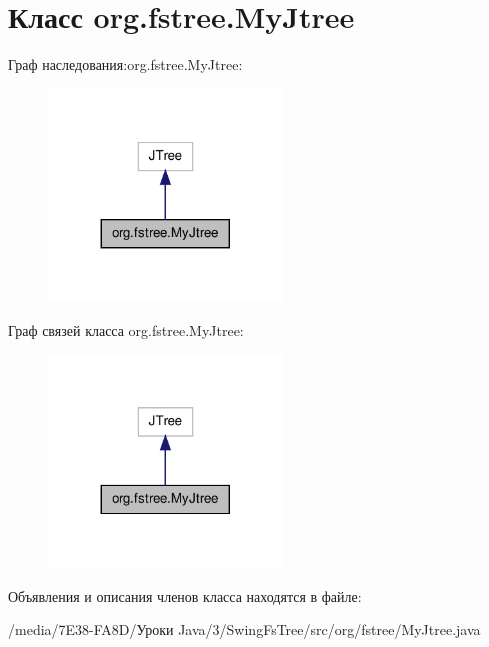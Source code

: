 \hypertarget{classorg_1_1fstree_1_1_my_jtree}{
\section{Класс org.fstree.MyJtree}
\label{classorg_1_1fstree_1_1_my_jtree}
}


Граф наследования:org.fstree.MyJtree:\nopagebreak
\begin{figure}[H]
\begin{center}
\leavevmode
\includegraphics[width=176pt]{classorg_1_1fstree_1_1_my_jtree__inherit__graph}
\end{center}
\end{figure}


Граф связей класса org.fstree.MyJtree:\nopagebreak
\begin{figure}[H]
\begin{center}
\leavevmode
\includegraphics[width=176pt]{classorg_1_1fstree_1_1_my_jtree__coll__graph}
\end{center}
\end{figure}


Объявления и описания членов класса находятся в файле:\begin{DoxyCompactItemize}
\item 
/media/7E38-\/FA8D/Уроки Java/3/SwingFsTree/src/org/fstree/MyJtree.java\end{DoxyCompactItemize}

